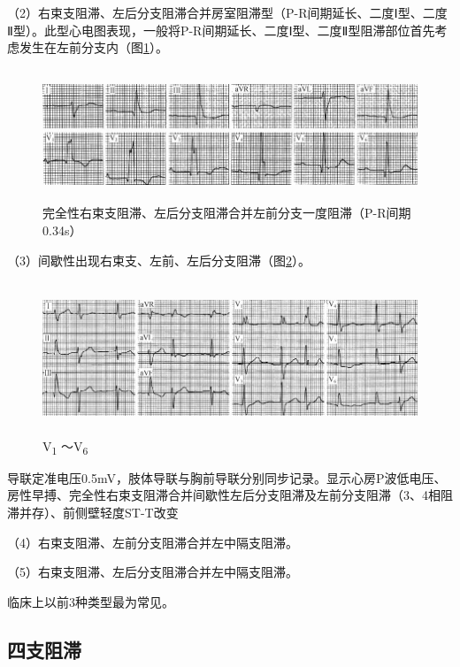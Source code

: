 （2）右束支阻滞、左后分支阻滞合并房室阻滞型（P-R间期延长、二度Ⅰ型、二度Ⅱ型）。此型心电图表现，一般将P-R间期延长、二度Ⅰ型、二度Ⅱ型阻滞部位首先考虑发生在左前分支内（图\ref{fig21-16}）。

\begin{figure}[!htbp]
 \centering
 \includegraphics[width=5.78125in,height=1.55208in]{./images/Image00364.jpg}
 \captionsetup{justification=centering}
 \caption{完全性右束支阻滞、左后分支阻滞合并左前分支一度阻滞（P-R间期0.34s）}
 \label{fig21-16}
  \end{figure} 

（3）间歇性出现右束支、左前、左后分支阻滞（图\ref{fig21-17}）。

\begin{figure}[!htbp]
 \centering
 \includegraphics[width=5.78125in,height=1.79167in]{./images/Image00365.jpg}
 \captionsetup{justification=centering}
 \caption{V\textsubscript{1} ～V\textsubscript{6}}
 \label{fig21-17}
  \end{figure} 
导联定准电压0.5mV，肢体导联与胸前导联分别同步记录。显示心房P波低电压、房性早搏、完全性右束支阻滞合并间歇性左后分支阻滞及左前分支阻滞（3、4相阻滞并存）、前侧壁轻度ST-T改变

（4）右束支阻滞、左前分支阻滞合并左中隔支阻滞。

（5）右束支阻滞、左后分支阻滞合并左中隔支阻滞。

临床上以前3种类型最为常见。

\protect\hypertarget{text00028.htmlux5cux23subid354}{}{}

\subsection{四支阻滞}


